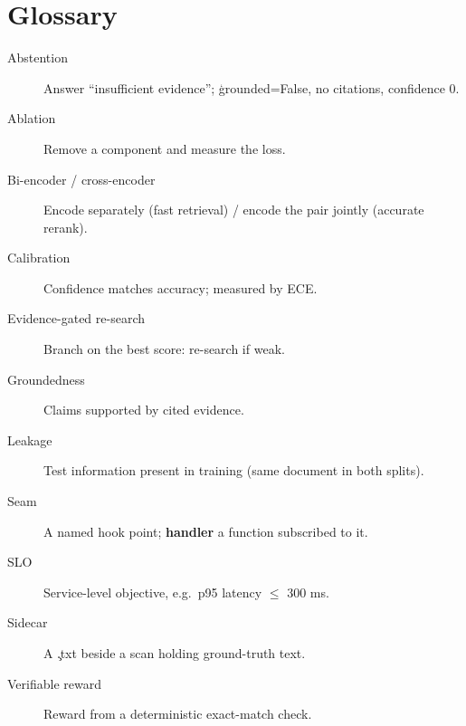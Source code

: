 \section{Glossary}
\begin{description}
 \item[Abstention] Answer ``insufficient evidence''; \c{grounded=False}, no citations, confidence 0.
 \item[Ablation] Remove a component and measure the loss.
 \item[Bi-encoder / cross-encoder] Encode separately (fast retrieval) / encode the pair jointly (accurate rerank).
 \item[Calibration] Confidence matches accuracy; measured by ECE.
 \item[Evidence-gated re-search] Branch on the best score: re-search if weak.
 \item[Groundedness] Claims supported by cited evidence.
 \item[Leakage] Test information present in training (same document in both splits).
 \item[Seam] A named hook point; \textbf{handler} a function subscribed to it.
 \item[SLO] Service-level objective, e.g.\ p95 latency $\le$ 300 ms.
 \item[Sidecar] A \c{.txt} beside a scan holding ground-truth text.
 \item[Verifiable reward] Reward from a deterministic exact-match check.
\end{description}

